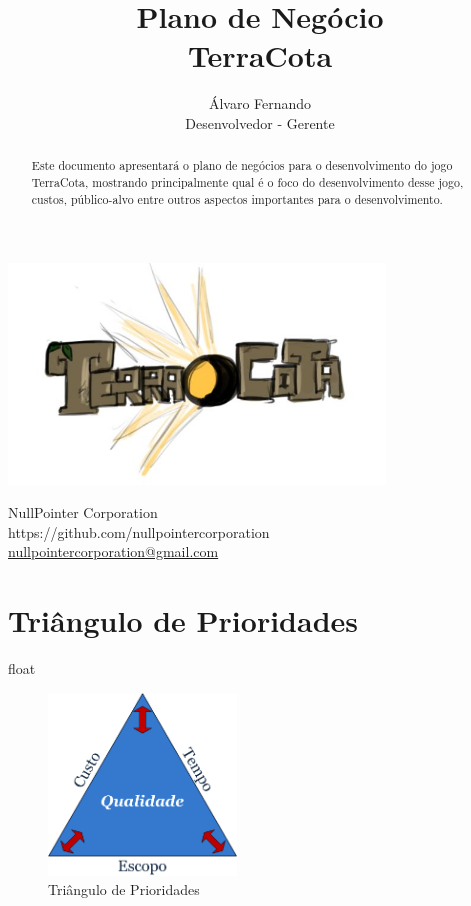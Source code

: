 \documentclass[a4paper,11pt]{article}
\title{Plano de Negócio\\TerraCota}
\author{Álvaro Fernando\\Desenvolvedor - Gerente}
\begin{document}
\begin{titlepage}
    \centering
    \maketitle
    \thispagestyle{empty}   %
    \includegraphics[width=10cm]{logo_inicial.jpg}
    \vfill
    {\raggedright
    NullPointer Corporation\\
    https://github.com/nullpointercorporation\\
    \href{mailto:nullpointercorporation@gmail.com}{nullpointercorporation@gmail.com}\\
    }
\end{titlepage}

\begin{abstract}
Este documento apresentará o plano de negócios para o desenvolvimento do jogo TerraCota, mostrando principalmente qual é o foco do desenvolvimento desse jogo, custos, público-alvo entre outros aspectos importantes para o desenvolvimento.

\end{abstract}

\pagebreak
\tableofcontents
\pagebreak

\section{Triângulo de Prioridades}
float
\begin{figure}[ht]
\centering
\includegraphics[width=5cm]{3_restricoes.png}
\caption{Triângulo de Prioridades}
\label{fig:restricoes}
\end{figure}
\end{document}
